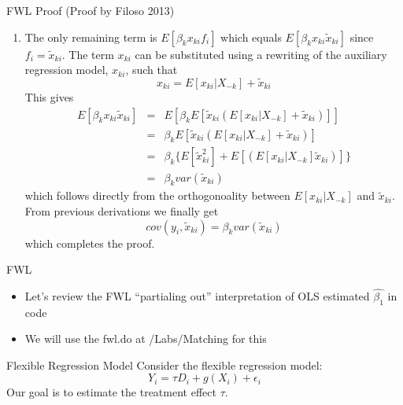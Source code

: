 \documentclass{beamer}
\begin{document}
\begin{frame}[plain, shrink=25]

	\begin{block}{FWL Proof  (Proof by Filoso 2013)}
		\begin{enumerate}\addtocounter{enumi}{3}
		\item The only remaining term is $E[\beta_kx_{ki}f_i]$ which equals $E[\beta_kx_{ki}\tilde{x}_{ki}]$ since $f_i=\tilde{x}_{ki}$. The term $x_{ki}$ can be substituted using a rewriting of the auxiliary regression model, $x_{ki}$, such that$$x_{ki} = E[x_{ki} | X_{-k}] + \tilde{x}_{ki}$$This gives
			\begin{eqnarray*}
			E[\beta_kx_{ki}\tilde{x}_{ki}] &=& E[\beta_kE[\tilde{x}_{ki}(E[x_{ki}|X_{-k}]+\tilde{x}_{ki})]] \\
			&=& \beta_kE[\tilde{x}_{ki}(E[x_{ki}|X_{-k}]+\tilde{x}_{ki})] \\
			&=&\beta_k\{E[\tilde{x}^2_{ki}] + E[(E[x_{ki}|X_{-k}]\tilde{x}_{ki})]\} \\
			&=& \beta_k var(\tilde{x}_{ki})
			\end{eqnarray*}which follows directly from the orthogonoality between $E[x_{ki} | X_{-k}]$ and $\tilde{x}_{ki}$. From previous derivations we finally get$$cov(y_i,\tilde{x}_{ki}) = \beta_kvar(\tilde{x}_{ki})$$which completes the proof. \qedhere
		\end{enumerate}
	\end{block}

\end{frame}

\begin{frame}{FWL}

\begin{itemize}
\item Let's review the FWL ``partialing out'' interpretation of OLS estimated $\widehat{\beta_1}$ in code
\item We will use the fwl.do at /Labs/Matching for this
\end{itemize}

\end{frame}





\begin{frame}{Flexible Regression Model}
  Consider the flexible regression model:
  \[
    Y_i = \tau D_i + g(X_i) + \epsilon_i
  \]
  Our goal is to estimate the treatment effect \( \tau \).
\end{frame}
\end{document}
